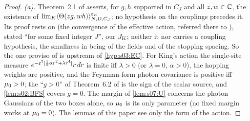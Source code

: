 \begin{proof}
\emph{(a).} Theorem~2.1 of \cite{K2} asserts, for $g,h$ supported in $C_J$ and all $z,w\in\mathbb C$, the existence of $\lim_K\langle\Theta(zg,wh)\rangle^{\varepsilon_K}_{N,D,C_J}$; no hypothesis on the couplings precedes it. Its proof rests on \cite[Thm.~3.1]{K1} (the convergence of the effective action, referred there to \cite{Ba1,Ba2,Ba3,Ba4}), stated ``for some fixed integer $J$'', our $J_{\rm K}$; neither it nor \cite[Thms.~2.1, 3.4]{K1} carries a coupling hypothesis, the smallness in \cite{K1} being of the fields and of the stopping spacing. So the one proviso of \cite[Prop.~3.1]{Ba2} is upstream of \cref{hyp:s03:EC}. For King's action the single-site measure $e^{-\varepsilon^3[\frac12\alpha r^2+\lambda r^4]}r\,dr$ is finite iff $\lambda>0$ (or $\lambda=0$, $\alpha>0$), the hopping weights are positive, and the Feynman-form photon covariance is positive iff $\mu_0>0$; the ``$g>0$'' of Theorem~6.2 of \cite{BFS1} is the sign of the scalar source, and \cref{lem:s02:BFS} covers $g=0$. The margin of \cref{lem:s07:U} concerns the photon Gaussians of the two boxes alone, so $\mu_0$ is its only parameter (no fixed margin works at $\mu_0=0$). The lemmas of this paper see only the form of the action.


\end{proof}
